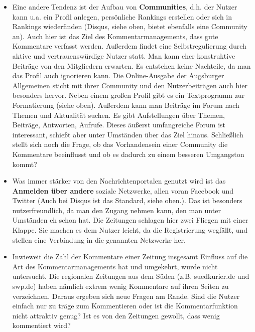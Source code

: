\begin{itemize}
  \item Eine andere Tendenz ist der Aufbau von {\bfseries Communities}, d.h.  der Nutzer kann u.a.
    ein Profil anlegen, persönliche Rankings erstellen oder sich in Rankings wiederfinden (Disqus,
    siehe oben,  bietet ebenfalls eine Community an). Auch hier ist das Ziel des
    Kommentarmanagements, dass gute Kommentare verfasst werden. Außerdem findet eine
    Selbstregulierung durch aktive und vertrauenswürdige Nutzer statt. Man kann eher konstruktive
    Beiträge von den Mitgliedern erwarten.  Es entstehen keine Nachteile, da man das Profil auch
    ignorieren kann.  Die Online-Ausgabe der Augsburger Allgemeinen sticht mit ihrer Community und
    den Nutzerbeiträgen auch hier besonders hervor. Neben einem großen Profil gibt es ein
    Textprogramm zur Formatierung (siehe oben). Außerdem kann man Beiträge im Forum nach Themen und
    Aktualität suchen. Es gibt Aufstellungen über Themen, Beiträge, Antworten, Aufrufe. Dieses
    äußerst umfangreiche Forum ist interessant, schießt aber unter Umständen über das Ziel hinaus.
    Schließlich stellt sich noch die Frage, ob das Vorhandensein einer Community die Kommentare
    beeinflusst und ob es dadurch zu einem besseren Umgangston kommt?

  \item Was immer stärker von den Nachrichtenportalen genutzt wird ist das {\bfseries Anmelden über
    andere} soziale Netzwerke, allen voran Facebook und Twitter (Auch bei Disqus ist das Standard,
    siehe oben.). Das ist besonders nutzerfreundlich, da man den Zugang nehmen kann, den man unter
    Umständen eh schon hat. Die Zeitungen schlagen hier zwei Fliegen mit einer Klappe. Sie machen es
    dem Nutzer leicht, da die Registrierung wegfällt, und stellen eine Verbindung in die genannten
    Netzwerke her. 

  \item Inwieweit die Zahl der Kommentare einer Zeitung insgesamt Einfluss auf die Art des
    Kommentarmanagements hat und umgekehrt, wurde nicht untersucht. Die regionalen Zeitungen aus dem
    Süden (z.B. suedkurier.de und swp.de) haben nämlich extrem wenig Kommentare auf ihren Seiten zu
    verzeichnen.  Daraus ergeben sich neue Fragen am Rande. Sind die Nutzer einfach nur zu träge zum
    Kommentieren oder ist die Kommentarfunktion nicht attraktiv genug? Ist es von den Zeitungen
    gewollt, dass wenig kommentiert wird? 
\end{itemize}


